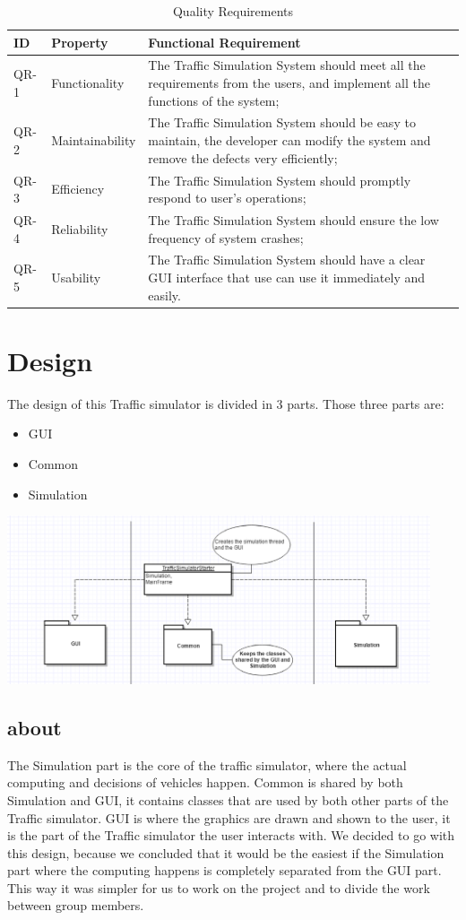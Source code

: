 \documentclass[a4paper,12pt]{article}
\begin{document}
\begin{table}[!htbp]
\centering
\label{versiontable}
\caption{Quality Requirements}
\begin{tabular}{|p{1.5cm}|p{3cm}|p{8cm}|}
\hline
ID & Property & Functional Requirement\\
\hline
QR-1& Functionality&  The Traffic Simulation System should meet all the requirements from the users, and implement all the functions of the system;\\
\hline
QR-2& Maintainability& The Traffic Simulation System should be easy to maintain, the developer can modify the system and remove the defects very efficiently;\\
\hline
QR-3& Efficiency& The Traffic Simulation System should promptly respond to user's operations;\\
\hline
QR-4& Reliability& The Traffic Simulation System should ensure the low frequency of system crashes;\\
\hline
QR-5& Usability& The Traffic Simulation System should have a clear GUI interface that use can use it immediately and easily.\\
\hline
\end{tabular}
\end{table}

\section{Design}
 	The design of this Traffic simulator is divided in 3 parts. Those three parts are:
 	\begin{itemize}
 		\item GUI
 		\item Common
 		\item Simulation
 	\end{itemize}
 	\includegraphics[width=12.5cm]{designIMG.eps}

 	\subsection{about}
 	The Simulation part is the core of the traffic simulator, where the actual computing and decisions of vehicles happen. Common is shared by both Simulation and GUI, it contains classes that are used by both other parts of the Traffic simulator. GUI is where the graphics are drawn and shown to the user, it is the part of the Traffic simulator the user interacts with.
 	\newline
 	We decided to go with this design, because we concluded that it would be the easiest if the Simulation part where the computing happens is completely separated from the GUI part. This way it was simpler for us to work on the project and to divide the work between group members.
\end{document}
